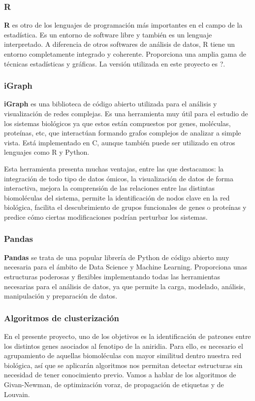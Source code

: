 \subsubsection{R}
\textbf{R} es otro de los lenguajes de programación más importantes en el campo de la estadística. Es un entorno de software libre y también es un lenguaje interpretado. A diferencia de otros softwares de análisis de datos, R tiene un entorno completamente integrado y coherente. Proporciona una amplia gama de técnicas estadísticas y gráficas. La versión utilizada en este proyecto es ?.

\subsubsection{iGraph}
\textbf{iGraph} es una biblioteca de código abierto utilizada para el análisis y visualización de redes complejas. Es una herramienta muy útil para el estudio de los sistemas biológicos ya que estos están compuestos por genes, moléculas, proteínas, etc, que interactúan formando grafos complejos de analizar a simple vista. Está implementado en C, aunque también puede ser utilizado en otros lenguajes como R y Python. 

Esta herramienta presenta muchas ventajas, entre las que destacamos: la integración de todo tipo de datos ómicos, la visualización de datos de forma interactiva, mejora la comprensión de las relaciones entre las distintas biomoléculas del sistema, permite la identificación de nodos clave en la red biológica, facilita el descubrimiento de grupos funcionales de genes o proteínas y predice cómo ciertas modificaciones podrían perturbar los sistemas.

\subsubsection{Pandas}
\textbf{Pandas} se trata de una popular librería de Python de código abierto muy necesaria para el ámbito de Data Science y Machine Learning. Proporciona unas estructuras poderosas y flexibles implementando todas las herramientas necesarias para el análisis de datos, ya que permite la carga, modelado, análisis, manipulación y preparación de datos.

\subsubsection{Algoritmos de clusterización}
En el presente proyecto, uno de los objetivos es la identificación de patrones entre los distintos genes asociados al fenotipo de la aniridia. Para ello, es necesario el agrupamiento de aquellas biomoléculas con mayor similitud dentro nuestra red biológica, así que se aplicarán algoritmos nos permitan detectar estructuras sin necesidad de tener conocimiento previo. Vamos a hablar de los algoritmos de Givan-Newman, de optimización voraz, de propagación de etiquetas y de Louvain.

